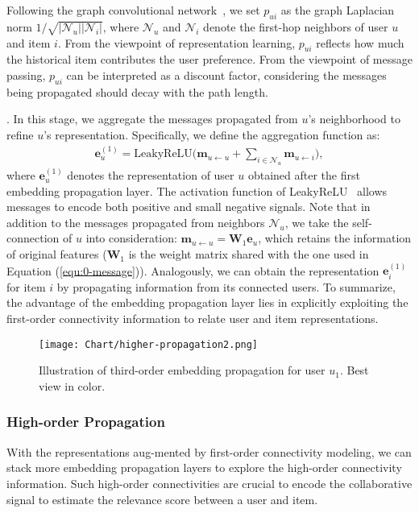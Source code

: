\documentclass[sigconf]{acmart}
\newcommand{\Mat}[1]{\mathbf{#1}}
\newcommand{\Set}[1]{\mathcal{#1}}
\theoremstyle{definition}
\begin{document}
Following the graph convolutional network~\cite{GCN}, we set $p_{ui}$ as the graph Laplacian norm $1/\sqrt{|\Set{N}_{u}||\Set{N}_{i}|}$, where $\Set{N}_{u}$ and $\Set{N}_{i}$ denote the first-hop neighbors of user $u$ and item $i$.
From the viewpoint of representation learning, $p_{ui}$ reflects how much the historical item contributes the user preference.
From the viewpoint of message passing, $p_{ui}$ can be interpreted as a discount factor, considering the messages being propagated should decay with the path length.



\vspace{+5pt}
. In this stage, we aggregate the messages propagated from $u$'s neighborhood to refine $u$'s representation.
Specifically, we define the aggregation function as:
\begin{gather}\label{equ:1-aggregator}
	\Mat{e}^{(1)}_{u}=\text{LeakyReLU}\Big(\Mat{m}_{u \leftarrow u} + \sum_{i\in\Set{N}_{u}}\Mat{m}_{u\leftarrow i}\Big),
\end{gather}
where $\Mat{e}^{(1)}_{u}$ denotes the representation of user $u$ obtained after the first embedding propagation layer. 
The activation function of LeakyReLU~\cite{LeakyRelu} allows messages to encode both positive and small negative signals.
Note that in addition to the messages propagated from neighbors $\Set{N}_u$,  we take the self-connection of $u$ into consideration: $\Mat{m}_{u\leftarrow u}=\Mat{W}_1\Mat{e}_{u}$, which retains the information of original features ($\Mat{W}_1$ is the weight matrix shared with the one used in Equation (\ref{equ:0-message})).
Analogously, we can obtain the representation $\Mat{e}_{i}^{(1)}$ for item $i$ by propagating information from its connected users.
To summarize, the advantage of the embedding propagation layer lies in explicitly exploiting the first-order connectivity information to relate user and item representations.

\begin{figure}[t]
\centering
\texttt{[image: Chart/higher-propagation2.png]}
\vspace{-10pt}
\caption{Illustration of third-order embedding propagation for user $u_{1}$. Best view in color. 
}
\label{fig:higher-order-propagation}
\vspace{-15pt}
\end{figure}

\vspace{5px}
\subsubsection{\textbf{High-order Propagation}}
With the representations aug-mented by first-order connectivity modeling, we can stack more embedding propagation layers to explore the high-order connectivity information. Such high-order connectivities are crucial to encode the collaborative signal to estimate the relevance score between a user and item.
\end{document}
